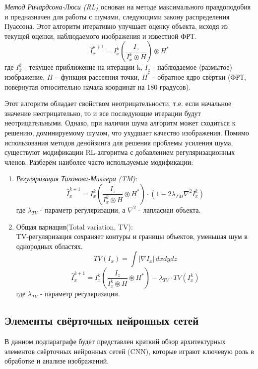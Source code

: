 \par \textit{Метод Ричардсона-Люси (RL)} основан на методе максимального правдоподобия и предназначен для работы с шумами, следующими закону распределения Пуассона. Этот алгоритм итеративно улучшает оценку объекта, исходя из текущей оценки, наблюдаемого изображения и известной ФРТ.\cite[328-329]{deconrl2004}
\begin{equation}
	\hat I^{k+1}_x = I^{k}_x(\frac{I_z}{I^{k}_x\circledast H})\circledast H^*
\end{equation}
где $I^k_x$ - текущее приближение на итерации k, $I_z$ - наблюдаемое (размытое) изображение, $H$ – функция рассеяния точки, $H^*$ - обратное ядро свёртки (ФРТ, повёрнутая относительно начала координат на 180 градусов).
\par Этот алгоритм обладает свойством неотрицательности, т.е. если начальное значение неотрицательно, то и все последующие итерации будут неотрицательными. Однако, при наличии шума алгоритм может сходиться к решению, доминируемому шумом, что ухудшает качество изображения. Помимо использования методов денойзинга для решения проблемы усиления шума, существуют модификации RL-алгоритма с добавлением регуляризационных членов. Разберём наиболее часто используемые модификации:
\begin{enumerate}[]
	\item \textit{Регуляризация Тихонова-Миллера (TM)}:\\
	\begin{equation}
		\hat I^{k+1}_x = I^{k}_x(\frac{I_z}{I^{k}_x\circledast H}\circledast H^*)\cdot(1 - 2\lambda_{TM}\nabla^2 I^{k}_x)
	\end{equation}
	где $\lambda_{TV}$ - параметр регуляризации, а $\nabla^2$ - лапласиан объекта.
	\item Общая вариация(Total variation, TV):\\
	TV-регуляризация сохраняет контуры и границы объектов, уменьшая шум в однородных областях.
	\begin{equation}
		TV(I_x) = \int |\nabla I_x| \, dxdydz
	\end{equation}
	\begin{equation}
		\hat I^{k+1}_x = I^{k}_x(\frac{I_z}{I^{k}_x\circledast H}\circledast H^*) - \lambda_{TV}\cdot TV(I^{k}_x)
	\end{equation}
	где $\lambda_{TV}$ - параметр регуляризации.
\end{enumerate}

\subsection{Элементы свёрточных нейронных сетей}
\par В данном подпараграфе будет представлен краткий обзор архитектурных элементов свёрточных нейронных сетей (CNN), которые играют ключевую роль в обработке и анализе изображений. 

